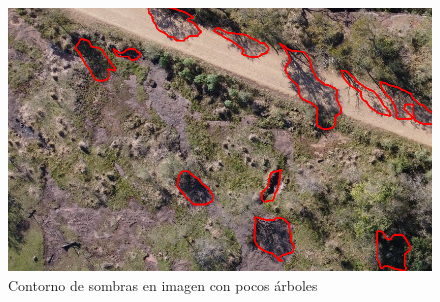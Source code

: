 \begin{figure}[h!]
    \includegraphics[width=\textwidth]{Imagenes/contours2.png}
     \hfill
     \caption{Contorno de sombras en imagen con pocos árboles}
    \label{contorno2}
\end{figure}

